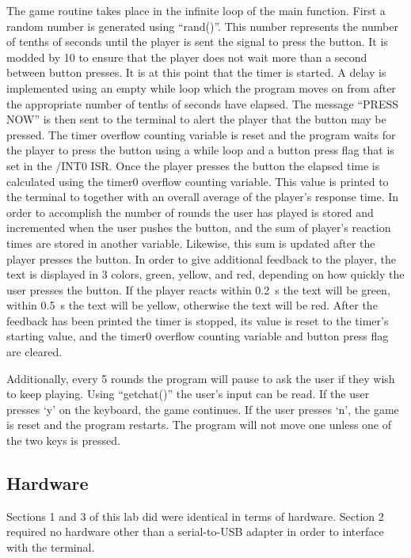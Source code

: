 \documentclass[12pt]{article}
\begin{document}
The game routine takes place in the infinite loop of the main function. First a random number is generated using ``rand()''. This number represents the number of tenths of seconds until the player is sent the signal to press the button. It is modded by 10 to ensure that the player does not wait more than a second between button presses. It is at this point that the timer is started. A delay is implemented using an empty while loop which the program moves on from after the appropriate number of tenths of seconds have elapsed. The message ``PRESS NOW'' is then sent to the terminal to alert the player that the button may be pressed. The timer overflow counting variable is reset and the program waits for the player to press the button using a while loop and a button press flag that is set in the /INT0 ISR. Once the player presses the button the elapsed time is calculated using the timer0 overflow counting variable. This value is printed to the terminal to together with an overall average of the player's response time. In order to accomplish the number of rounds the user has played is stored and incremented when the user pushes the button, and the sum of player's reaction times are stored in another variable. Likewise, this sum is updated after the player presses the button. In order to give additional feedback to the player, the text is displayed in 3 colors, green, yellow, and red, depending on how quickly the user presses the button. If the player reacts within \SI{0.2}{s} the text will be green, within \SI{0.5}{s} the text will be yellow, otherwise the text will be red. After the feedback has been printed the timer is stopped, its value is reset to the timer's starting value, and the timer0 overflow counting variable and button press flag are cleared.

Additionally, every 5 rounds the program will pause to ask the user if they wish to keep playing. Using ``getchat()'' the user's input can be read. If the user presses `y' on the keyboard, the game continues. If the user presses `n', the game is reset and the program restarts. The program will not move one unless one of the two keys is pressed.

\subsection{Hardware}

Sections 1 and 3 of this lab did were identical in terms of hardware. Section 2 required no hardware other than a serial-to-USB adapter in order to interface with the terminal.
\end{document}
